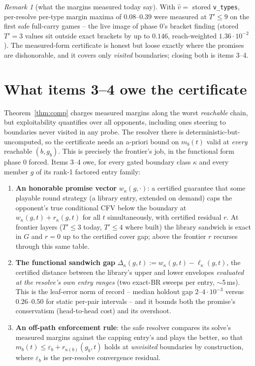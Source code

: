 \documentclass[11pt]{article}
\theoremstyle{plain}
\theoremstyle{definition}
\theoremstyle{remark}
\newtheorem{remark}[theorem]{Remark}
\begin{document}
\begin{remark}[what the margins measured today say]
With $\hat v = $ stored \texttt{v\_types}, per-resolve per-type margin
maxima of $0.08$--$0.39$ were measured at $T' \le 9$ on the first safe
full-carry games -- the live image of phase 0's bracket finding
(stored $T'{=}3$ values sit outside exact brackets by up to $0.146$,
reach-weighted $1.36\cdot 10^{-2}$). The measured-form certificate is
honest but loose exactly where the promises are dishonorable, and it
covers only \emph{visited} boundaries; closing both is items 3--4.
\end{remark}

\section{What items 3--4 owe the certificate}\label{sec:owe}

Theorem~\ref{thm:comp} charges measured margins along the worst
\emph{reachable} chain, but exploitability quantifies over all
opponents, including ones steering to boundaries never visited in any
probe. The resolver there is deterministic-but-uncomputed, so the
certificate needs an a-priori bound on $m_b(t)$ valid at \emph{every}
reachable $(b, g_b)$. This is precisely the frontier's job, in the
functional form phase 0 forced. Items 3--4 owe, for every gated
boundary class $\kappa$ and every member $g$ of its rank-1 factored
entry family:

\begin{enumerate}
\item \textbf{An honorable promise vector} $w_\kappa(g, \cdot)$: a
  certified guarantee that some playable round strategy (a library
  entry, extended on demand) caps the opponent's true conditional CFV
  below the boundary at $w_\kappa(g,t) + r_\kappa(g,t)$ for all $t$
  simultaneously, with certified residual $r$. At frontier layers
  ($T' \le 3$ today, $T' \le 4$ where built) the library sandwich is
  exact in $G$ and $r = 0$ up to the certified cover gap; above the
  frontier $r$ recurses through this same table.
\item \textbf{The functional sandwich gap}
  $\Delta_\kappa(g,t) := w_\kappa(g,t) - \ell_\kappa(g,t)$, the
  certified distance between the library's upper and lower envelopes
  \emph{evaluated at the resolve's own entry ranges} (two exact-BR
  sweeps per entry, $\sim$5\,ms). This is the leaf-error norm of
  record -- median holdout gap $2$--$4\cdot 10^{-3}$ versus $0.26$--$0.50$
  for static per-pair intervals -- and it bounds both the promise's
  conservatism (head-to-head cost) and its overshoot.
\item \textbf{An off-path enforcement rule}: the safe resolver
  compares its solve's measured margins against the capping entry's
  and plays the better, so that
  $m_b(t) \le \varepsilon_b + r_{\kappa(b)}(g_b, t)$ holds at
  \emph{unvisited} boundaries by construction, where $\varepsilon_b$
  is the per-resolve convergence residual.
\end{enumerate}
\end{document}
